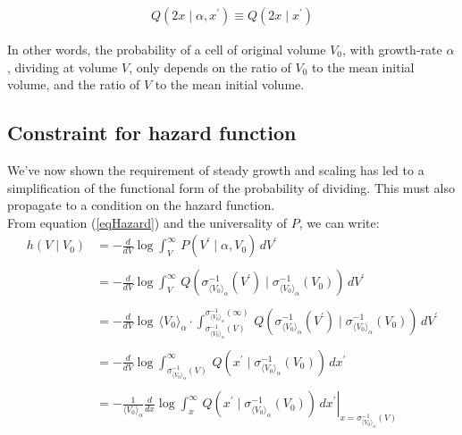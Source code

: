 \documentclass{article}
\begin{document}
\begin{align}
Q(2 x \mid \alpha, x^\prime ) \equiv Q(2 x \mid x^\prime )
\end{align}

In other words, the probability of a cell of original volume $V_0$, with growth-rate $\alpha$, dividing at volume $V$, only depends on the ratio of $V_0$ to the mean initial volume, and the ratio of $V$ to the mean initial volume.

\subsection{Constraint for hazard function}

We've now shown the requirement of steady growth and scaling has led to a simplification of the functional form of the probability of dividing. This must also propagate to a condition on the hazard function.\\

From equation (\ref{eqHazard}) and the universality of $P$, we can write:\\

\begin{align}
h(V \mid V_0) &= - \frac{d}{dV} \log \int^{\infty}_{V} \, P(V^\prime \mid \alpha, V_0) \, dV^\prime\\ 
\nonumber \\
&= - \frac{d}{dV} \log \int^{\infty}_{V} \, Q( \sigma_{\langle V_0 \rangle_\alpha}^{-1}(V^\prime) \mid \sigma_{\langle V_0 \rangle_\alpha}^{-1}(V_0) ) \, dV^\prime\\ 
\nonumber \\
&= - \frac{d}{dV} \log \, \langle V_0 \rangle_\alpha \cdot \int^{\sigma_{\langle V_0 \rangle_\alpha}^{-1}(\infty)}_{\sigma_{\langle V_0 \rangle_\alpha}^{-1}(V)} \, Q( \sigma_{\langle V_0 \rangle_\alpha}^{-1}(V^\prime) \mid \sigma_{\langle V_0 \rangle_\alpha}^{-1}(V_0) ) \, dV^\prime\\ 
\nonumber \\
&= - \frac{d}{dV} \log \int^{\infty}_{\sigma_{\langle V_0 \rangle_\alpha}^{-1}(V)} \, Q( x^\prime \mid \sigma_{\langle V_0 \rangle_\alpha}^{-1}(V_0) ) \, dx^\prime\\ 
\nonumber \\
&= - \frac{1}{\langle V_0 \rangle_\alpha} \frac{d}{dx} \left. \log \int^{\infty}_{x} \, Q( x^\prime \mid \sigma_{\langle V_0 \rangle_\alpha}^{-1}(V_0) ) \, dx^\prime \right|_{x = \sigma_{\langle V_0 \rangle_\alpha}^{-1} (V)}
\end{align}
\end{document}
